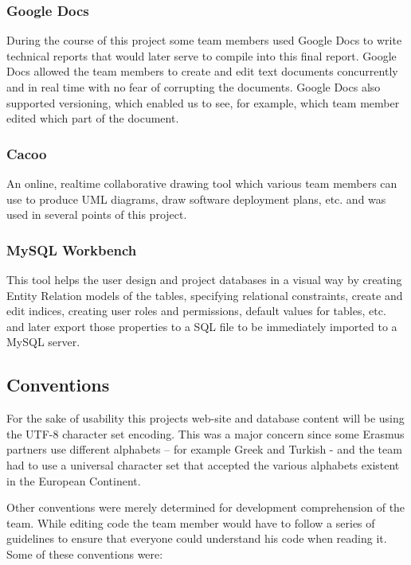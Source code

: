 \subsubsection{Google Docs}

During the course of this project some team members used Google Docs to write
technical reports that would later serve to compile into this final report.
Google Docs allowed the team members to create and edit text documents
concurrently and in real time with no fear of corrupting the documents. Google
Docs also supported versioning, which enabled us to see, for example, which team
member edited which part of the document.

\subsubsection{Cacoo}

An online, realtime collaborative drawing tool which various team members can
use to produce UML diagrams, draw software deployment plans, etc. and was used
in several points of this project.

\subsubsection{MySQL Workbench}

This tool helps the user design and project databases in a visual way by
creating Entity Relation models of the tables, specifying relational
constraints, create and edit indices, creating user roles and permissions,
default values for tables, etc. and later export those properties to a SQL file
to be immediately imported to a MySQL server.


\subsection{Conventions}

For the sake of usability this projects web-site and database content will be
using the UTF-8 character set encoding. This was a major concern since some
Erasmus partners use different alphabets – for example Greek and Turkish - and
the team had to use a   universal character set that accepted the various
alphabets existent in the European Continent. 

Other conventions were merely determined for development comprehension of the
team. While editing code the team member would have to follow a series of
guidelines to ensure that everyone could understand his code when reading it.
Some of these conventions were:

